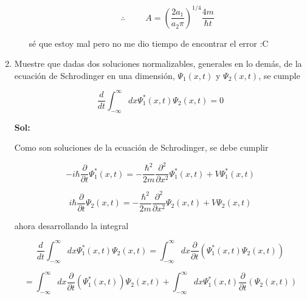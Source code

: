 \documentclass[12pt,a4paper]{article}
\begin{document}
\begin{enumerate}
\begin{enumerate}
        \begin{equation*}
            \therefore \hspace{1cm} A  = \left(\frac{2 a_1}{ a_2 \pi}\right)^{1/4} \frac{4m}{\hbar t}
        \end{equation*}
        
        sé que estoy mal pero no me dio tiempo de encontrar el error :C
        
    \end{enumerate}
    
    
    
    
    
    
    \item Muestre que dadas dos soluciones normalizables, generales en lo demás, de la ecuación de Schrodinger en una dimensión, $\Psi_1 (x,t)$ y $\Psi_2 (x,t)$, se cumple
    
    \begin{equation*}
        \frac{d}{dt} \int_{-\infty}^{\infty} dx \Psi_{1}^{*} (x,t) \Psi_2 (x,t) = 0
    \end{equation*}
    
    \textbf{Sol:}
    
    Como son soluciones de la ecuación de Schrodinger, se debe cumplir
    
    \begin{equation*}
        -i \hbar \frac{\partial}{\partial t} \Psi_1^* (x,t) = - \frac{\hbar^2}{2m} \frac{\partial^2}{\partial x^2} \Psi_1^* (x,t) + V \Psi_1^* (x,t) 
    \end{equation*}
    
    \begin{equation*}
        i \hbar \frac{\partial}{\partial t} \Psi_2 (x,t) = - \frac{\hbar^2}{2m} \frac{\partial^2}{\partial x^2} \Psi_2 (x,t) + V \Psi_2 (x,t) 
    \end{equation*}
    
    ahora desarrollando la integral
    
    \begin{equation*}
        \frac{d}{d t} \int_{-\infty}^{\infty} dx \Psi_{1}^{*} (x,t) \Psi_2 (x,t) = \int_{-\infty}^{\infty} dx \frac{\partial}{\partial t} (\Psi_{1}^{*} (x,t) \Psi_2 (x,t))
    \end{equation*}
    
    \begin{equation*}
        = \int_{-\infty}^{\infty} dx \frac{\partial}{\partial t} (\Psi_{1}^{*} (x,t)) \Psi_2 (x,t) + \int_{-\infty}^{\infty} dx \Psi_{1}^{*} (x,t) \frac{\partial}{\partial t} (\Psi_2 (x,t))
    \end{equation*}
    

\end{enumerate}
\end{document}
